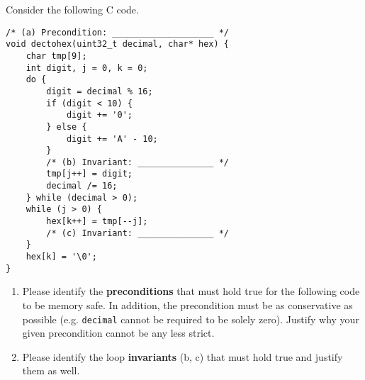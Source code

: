 \documentclass[12pt]{exam}
\newcommand{\solbox}[2]{%
\fbox{%
\parbox[c][#1][t]{\dimexpr\linewidth-2\fboxsep-2\fboxrule}{
  \hrule width \hsize height 0pt
  #2
 }%
}%
\par\vspace{\ht\strutbox}
}
\newcommand{\textfield}[3]{%
\iftoggle{pdfform}{%
\TextField[name = #1, backgroundcolor=white, height=#2,
width = \linewidth, multiline=true]{\mbox}%
}{%
\ifprintanswers\else{%
    \solbox{#2}{#3}}
\fi%
}%
}
\begin{document}
\begin{Form}
\begin{questions}
Consider the following C code.

\begin{lstlisting}
/* (a) Precondition: ____________________ */
void dectohex(uint32_t decimal, char* hex) {
    char tmp[9];
    int digit, j = 0, k = 0;
    do {
        digit = decimal % 16;
        if (digit < 10) {
            digit += '0';
        } else {
            digit += 'A' - 10;
        }
        /* (b) Invariant: _______________ */
        tmp[j++] = digit;
        decimal /= 16;
    } while (decimal > 0);
    while (j > 0) {
        hex[k++] = tmp[--j];
        /* (c) Invariant: _______________ */
    }
    hex[k] = '\0';
}
\end{lstlisting}

\begin{enumerate}
\item Please identify the \textbf{preconditions} that must hold true for the following code to be memory safe. In addition, the precondition must be as conservative as possible (e.g. \texttt{decimal} cannot be required to be solely zero). Justify why your given precondition cannot be any less strict.\\
\textfield{Q5P1}{4.5cm}{
`hex' shouldn't be NULL and it should be a valid address. And the memory spaces it points to should be at least 9 bytes long to avoid possible overflow. 

Justify: `decimal' is 32-bits unsigned integer number. So when it is converted into hexadecimal representation, it should be no longer than 8 character long. Thus, codes within the first do-while loop will be executed no more than 8 times. Plus 1 byte for null terminator in line 20. In total, at least 9 bytes is required to eliminate potential vulnerability.
}
\item Please identify the loop \textbf{invariants} (b, c) that must hold true and justify them as well.\\
\textfield{Q5P2}{4.5cm}{
invariants(b): $0 < j < 8$  \&\&  $0 \leq \operatorname{decimal} \leq$ 0xFFFFFFFF \&\& digit $\in$ \{`0', `1', `2', ..., `E', `F'\}

`decimal' is 32-bits unsigned integer, therefore it will definitely greater than or equal to 0 and less than or equal to 0xFFFFFFFF. Since `decimal' will be divided by 16 in each loop, this do-will loop will be executed no more than 8 times. This guarantee $0 < j < 8$. Line 7-11 make sure `digit' will hold valid hexadecimal character.

}
\end{enumerate}
\end{questions}
\end{Form}
\end{document}

